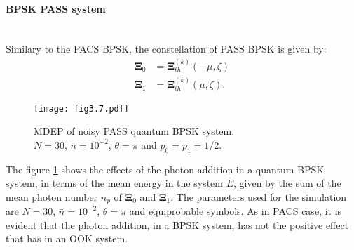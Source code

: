         \paragraph{BPSK PASS system}\mbox{}\\
        Similary to the PACS BPSK, the constellation of PASS BPSK is given by:
        \begin{equation}
            \begin{split}
                \pmb{\Xi}_0 &= \pmb{\Xi}_{th}^{(k)}(-\mu,\zeta)\\
                \pmb{\Xi}_1 &= \pmb{\Xi}_{th}^{(k)}(\mu,\zeta).
            \end{split}
        \end{equation}
        \begin{figure}[tbp]
            \begin{center}
                \texttt{[image: fig3.7.pdf]}
                \caption{MDEP of noisy PASS quantum BPSK system.\\
                $N=30$, $\bar{n}=10^{-2}$, $\theta=\pi$ and $p_0=p_1=1/2$.}
                \label{fig:3.7}
            \end{center}
        \end{figure}
        The figure \ref{fig:3.7} shows the effects of the photon addition in a quantum BPSK
        system, in terms of the mean energy in the system $\bar{E}$, given by the sum of 
        the mean photon number $n_p$ of $\pmb{\Xi}_0$ and $\pmb{\Xi}_1$. The parameters used
        for the simulation are $N=30$, $\bar{n}=10^{-2}$, $\theta=\pi$ and equiprobable symbols.
        As in PACS case, it is evident that the photon addition, in a BPSK system, has not
        the positive effect that has in an OOK system.